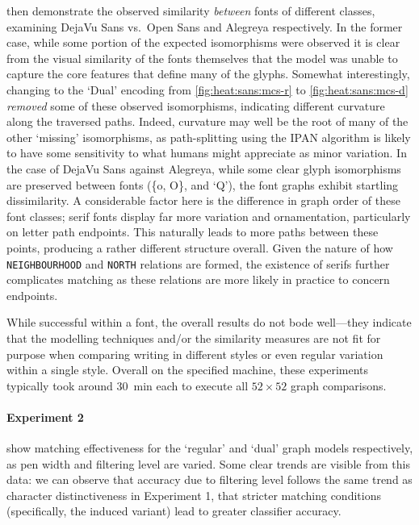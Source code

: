 \documentclass{mpaper}
\begin{document}
 then demonstrate the observed similarity \emph{between} fonts of different classes, examining DejaVu Sans vs.\ Open Sans and Alegreya respectively.
In the former case, while some portion of the expected isomorphisms were observed it is clear from the visual similarity of the fonts themselves that the model was unable to capture the core features that define many of the glyphs.
Somewhat interestingly, changing to the `Dual' encoding from \cref{fig:heat:sans:mcs-r} to \cref{fig:heat:sans:mcs-d} \emph{removed} some of these observed isomorphisms, indicating different curvature along the traversed paths.
Indeed, curvature may well be the root of many of the other `missing' isomorphisms, as path-splitting using the IPAN algorithm is likely to have some sensitivity to what humans might appreciate as minor variation.
In the case of DejaVu Sans against Alegreya, while some clear glyph isomorphisms are preserved between fonts (\{o, O\}, and `Q'), the font graphs exhibit startling dissimilarity.
A considerable factor here is the difference in graph order of these font classes; serif fonts display far more variation and ornamentation, particularly on letter path endpoints.
This naturally leads to more paths between these points, producing a rather different structure overall.
Given the nature of how \texttt{NEIGHBOURHOOD} and \texttt{NORTH} relations are formed, the existence of serifs further complicates matching as these relations are more likely in practice to concern endpoints.

While successful within a font, the overall results do not bode well---they indicate that the modelling techniques and/or the similarity measures are not fit for purpose when comparing writing in different styles or even regular variation within a single style.
Overall on the specified machine, these experiments typically took around \SI{30}{\minute} each to execute all $52\times52$ graph comparisons.

\paragraph{Experiment 2}
 show matching effectiveness for the `regular' and `dual' graph models respectively, as pen width and filtering level are varied.
Some clear trends are visible from this data: we can observe that accuracy due to filtering level follows the same trend as character distinctiveness in Experiment 1, that stricter matching conditions (specifically, the induced variant) lead to greater classifier accuracy.
\end{document}
